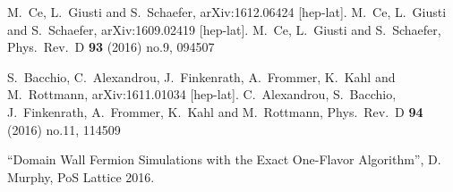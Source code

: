 \documentclass{PoS}
\begin{document}
\begin{thebibliography}{99}
 M.~Ce, L.~Giusti and S.~Schaefer,
  arXiv:1612.06424 [hep-lat].
  M.~Ce, L.~Giusti and S.~Schaefer,
  arXiv:1609.02419 [hep-lat].
  M.~Ce, L.~Giusti and S.~Schaefer,
  Phys.\ Rev.\ D {\bf 93} (2016) no.9,  094507

  S.~Bacchio, C.~Alexandrou, J.~Finkenrath, A.~Frommer, K.~Kahl and M.~Rottmann,
  arXiv:1611.01034 [hep-lat].
 C.~Alexandrou, S.~Bacchio, J.~Finkenrath, A.~Frommer, K.~Kahl and M.~Rottmann,
  Phys.\ Rev.\ D {\bf 94} (2016) no.11,  114509

 ``Domain Wall Fermion Simulations with the Exact One-Flavor Algorithm'', D. Murphy, PoS Lattice 2016.

\end{thebibliography}
\end{document}
